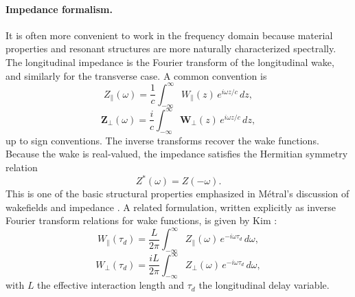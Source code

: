 \documentclass[11pt,a4paper]{article}
\begin{document}
\begin{sloppypar}
\paragraph{Impedance formalism.}
It is often more convenient to work in the frequency domain because material properties and resonant structures are more naturally characterized spectrally. The longitudinal impedance is the Fourier transform of the longitudinal wake, and similarly for the transverse case. A common convention is
\begin{equation}
Z_{\parallel}(\omega)
=
\frac{1}{c}
\int_{-\infty}^{\infty}
W_{\parallel}(z)\,e^{i\omega z/c}\,dz,
\label{eq:Zlong}
\end{equation}
\begin{equation}
\mathbf Z_{\perp}(\omega)
=
\frac{i}{c}
\int_{-\infty}^{\infty}
\mathbf W_{\perp}(z)\,e^{i\omega z/c}\,dz,
\label{eq:Ztrans}
\end{equation}
up to sign conventions. The inverse transforms recover the wake functions. Because the wake is real-valued, the impedance satisfies the Hermitian symmetry relation
\begin{equation}
Z^*(\omega)=Z(-\omega).
\label{eq:impedance_symmetry}
\end{equation}
This is one of the basic structural properties emphasized in Métral’s discussion of wakefields and impedance \cite{metral_wake_2021-1}. A related formulation, written explicitly as inverse Fourier transform relations for wake functions, is given by Kim \cite{kim_mbtrack2_cuda_2025}:
\begin{equation}
W_{\parallel}(\tau_d)
=
\frac{L}{2\pi}
\int_{-\infty}^{\infty}
Z_{\parallel}(\omega)\,e^{-i\omega \tau_d}\,d\omega,
\end{equation}
\begin{equation}
W_{\perp}(\tau_d)
=
\frac{iL}{2\pi}
\int_{-\infty}^{\infty}
Z_{\perp}(\omega)\,e^{-i\omega \tau_d}\,d\omega,
\end{equation}
with $L$ the effective interaction length and $\tau_d$ the longitudinal delay variable. 


\end{sloppypar}
\end{document}
